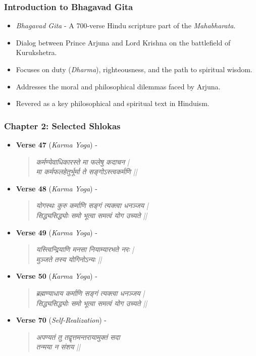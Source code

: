 \begin{frame}[fragile]\frametitle{Introduction to Bhagavad Gita}

      \begin{itemize}
		\item \textit{Bhagavad Gita} - A 700-verse Hindu scripture part of the \textit{Mahabharata}.
		\item Dialog between Prince Arjuna and Lord Krishna on the battlefield of Kurukshetra.
		\item Focuses on duty (\textit{Dharma}), righteousness, and the path to spiritual wisdom.
		\item Addresses the moral and philosophical dilemmas faced by Arjuna.
		\item Revered as a key philosophical and spiritual text in Hinduism.
	  \end{itemize}

\end{frame}

\begin{frame}[fragile]\frametitle{Chapter 2: Selected Shlokas}

      \begin{itemize}
		\item \textbf{Verse 47} (\textit{Karma Yoga}) - 
		\begin{quote}
			\textit{कर्मण्येवाधिकारस्ते मा फलेषु कदाचन |} \\
			\textit{मा कर्मफलहेतुर्भूर्मा ते सङ्गोऽस्त्वकर्मणि ||}
		\end{quote}
		\item \textbf{Verse 48} (\textit{Karma Yoga}) - 
		\begin{quote}
			\textit{योगस्थः कुरु कर्माणि सङ्गं त्यक्त्वा धनञ्जय |} \\
			\textit{सिद्ध्यसिद्ध्योः समो भूत्वा समत्वं योग उच्यते ||}
		\end{quote}
		\item \textbf{Verse 49} (\textit{Karma Yoga}) - 
		\begin{quote}
			\textit{यस्त्विन्द्रियाणि मनसा नियाम्यारभते नरः |} \\
			\textit{मुञ्जते तस्य योगिनोऽन्यः ||}
		\end{quote}
		\item \textbf{Verse 50} (\textit{Karma Yoga}) - 
		\begin{quote}
			\textit{ब्रह्मण्याधाय कर्माणि सङ्गं त्यक्त्वा धनञ्जय |} \\
			\textit{सिद्ध्यसिद्ध्योः समो भूत्वा समत्वं योग उच्यते ||}
		\end{quote}
		\item \textbf{Verse 70} (\textit{Self-Realization}) - 
		\begin{quote}
			\textit{अपण्यतं तु तद्वृत्तमन्तरायामुक्तं सदा} \\
			\textit{तन्मया न संशय ||}
		\end{quote}
	  \end{itemize}

\end{frame}

